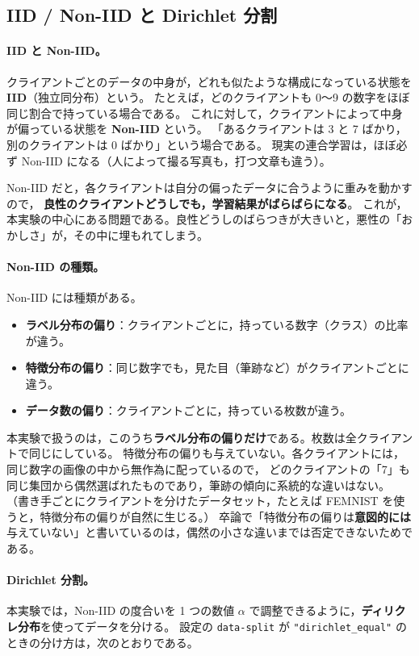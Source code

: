\documentclass[a4j, dvipdfmx]{jsarticle}  %
\begin{document}
\subsection{IID / Non-IID と Dirichlet 分割}
\label{sec:noniid}

\paragraph{IID と Non-IID。}
クライアントごとのデータの中身が，どれも似たような構成になっている状態を \textbf{IID}（独立同分布）という。
たとえば，どのクライアントも 0〜9 の数字をほぼ同じ割合で持っている場合である。
これに対して，クライアントによって中身が偏っている状態を \textbf{Non-IID} という。
「あるクライアントは 3 と 7 ばかり，別のクライアントは 0 ばかり」という場合である。
現実の連合学習は，ほぼ必ず Non-IID になる（人によって撮る写真も，打つ文章も違う）。

Non-IID だと，各クライアントは自分の偏ったデータに合うように重みを動かすので，
\textbf{良性のクライアントどうしでも，学習結果がばらばらになる}。
これが，本実験の中心にある問題である。良性どうしのばらつきが大きいと，悪性の「おかしさ」が，その中に埋もれてしまう。

\paragraph{Non-IID の種類。}
Non-IID には種類がある。
\begin{itemize}
  \item \textbf{ラベル分布の偏り}：クライアントごとに，持っている数字（クラス）の比率が違う。
  \item \textbf{特徴分布の偏り}：同じ数字でも，見た目（筆跡など）がクライアントごとに違う。
  \item \textbf{データ数の偏り}：クライアントごとに，持っている枚数が違う。
\end{itemize}
本実験で扱うのは，このうち\textbf{ラベル分布の偏りだけ}である。枚数は全クライアントで同じにしている。
特徴分布の偏りも与えていない。各クライアントには，同じ数字の画像の中から無作為に配っているので，
どのクライアントの「7」も同じ集団から偶然選ばれたものであり，筆跡の傾向に系統的な違いはない。
（書き手ごとにクライアントを分けたデータセット，たとえば FEMNIST を使うと，特徴分布の偏りが自然に生じる。）
卒論で「特徴分布の偏りは\textbf{意図的には}与えていない」と書いているのは，偶然の小さな違いまでは否定できないためである。

\paragraph{Dirichlet 分割。}
本実験では，Non-IID の度合いを 1 つの数値 $\alpha$ で調整できるように，\textbf{ディリクレ分布}を使ってデータを分ける。
設定の \texttt{data-split} が \texttt{"dirichlet\_equal"} のときの分け方は，次のとおりである。
\end{document}
